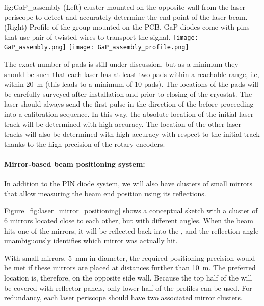 \begin{dunefigure}{fig:GaP_assembly}
{(Left)  cluster mounted on the opposite wall from the laser periscope to detect and accurately determine the end point of the laser beam. (Right)
Profile of the  group mounted on the PCB. GaP diodes come with pins that use pair of twisted wires to transport the signal.}
\texttt{[image: GaP\_assembly.png]} 
\texttt{[image: GaP\_assembly\_profile.png]} 
\end{dunefigure}

The exact number of pads is still under discussion, but as a minimum they should be such that each laser has at least two pads within a reachable range, i.e, within \SI{20}{\m} (this leads to a minimum of 10 pads). The locations of the pads will be carefully surveyed after installation and prior to closing of the cryostat. The laser should always send the first pulse in the direction of the  before proceeding into a calibration sequence. In this way, the absolute location of the initial laser track will be determined with high accuracy. The location of the other laser tracks will also be determined with high accuracy with respect to the initial track thanks to the high precision of the rotary encoders.



\paragraph{Mirror-based beam positioning system:}

In addition to the PIN diode system, we will also have clusters of small mirrors that allow measuring the beam end position using its reflections.

Figure~\ref{fig:laser_mirror_positioning} shows a conceptual sketch with a cluster of \num{6} mirrors located close to each other, but with different angles. 
When the beam hits one of the mirrors, it will be reflected back into the , and the reflection angle unambiguously identifies which mirror was actually hit. 

With small mirrors, \SI{5}{\milli\m} in diameter, the required positioning precision would be met if these mirrors are placed at distances further than \SI{10}{\m}. The preferred location is, therefore, on the opposite  side wall. Because the top half of the  will be covered with  reflector panels, only lower half of the  profiles can be used. For redundancy, each laser periscope should have two associated mirror clusters. 

